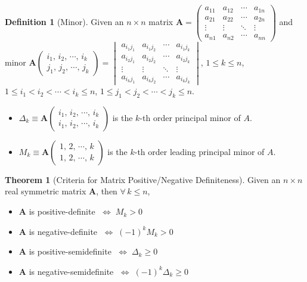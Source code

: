 \documentclass[12pt]{extarticle}
\newcommand{\ds}{\displaystyle}
\newcommand{\ifff}{\;\Longleftrightarrow\;}
\theoremstyle{definition}
\newtheorem*{dfn}{Definition}
\newtheorem*{thm}{Theorem}
\newcommand{\vA}{\mathbf{A}}
\begin{document}
\begin{dfn}[Minor] 
  Given an $n\times n$ matrix $\ds\vA = \begin{pmatrix}a_{11} & a_{12} & \cdots & a_{1n} \\ a_{21} & a_{22} & \cdots & a_{2n} \\ \vdots & \vdots & \ddots & \vdots \\ a_{n1} & a_{n2} & \cdots & a_{nn} \end{pmatrix}$ and minor $\ds\vA\begin{pmatrix}i_1,\,i_2,\,\cdots,\,i_k\\j_1,\,j_2,\,\cdots,\,j_k\end{pmatrix} = \begin{vmatrix}a_{i_1 j_1} & a_{i_1 j_2} & \cdots & a_{i_1 j_k} \\ a_{i_2 j_1} & a_{i_2 j_2} & \cdots & a_{i_2 j_k} \\ \vdots & \vdots & \ddots & \vdots \\ a_{i_k j_1} & a_{i_k j_2} & \cdots & a_{i_k j_k} \end{vmatrix}$, $1\leqslant k\leqslant n$, $1\leqslant i_1 < i_2 < \cdots < i_k \leqslant n$, $1\leqslant j_1 < j_2 < \cdots < j_k \leqslant n$. 
  \begin{itemize}\setlength\itemsep{0em}
    \item $\ds\Delta_k\equiv\vA\begin{pmatrix}i_1,\,i_2,\,\cdots,\,i_k\\i_1,\,i_2,\,\cdots,\,i_k\end{pmatrix}$ is the $k$-th order principal minor of $A$. 
    \item $\ds M_k\equiv\vA\begin{pmatrix}1,\,2,\,\cdots,\,k\\1,\,2,\,\cdots,\,k\end{pmatrix}$ is the $k$-th order leading principal minor of $A$. 
  \end{itemize}
\end{dfn}

\begin{thm}[Criteria for Matrix Positive/Negative Definiteness] 
  Given an $n\times n$ real symmetric matrix $\vA$, then $\forall\,k\leqslant n$, 
  \begin{multicols}{2}
    \begin{itemize}\setlength\itemsep{0em}
      \item $\vA$ is positive-definite $\ifff M_k > 0$
      \item $\vA$ is negative-definite $\ifff (-1)^k M_k> 0$
      \item $\vA$ is positive-semidefinite $\ifff \Delta_k \geqslant 0$
      \item $\vA$ is negative-semidefinite $\ifff (-1)^k \Delta_k \geqslant 0$
    \end{itemize}
  \end{multicols}
\end{thm}
\end{document}

